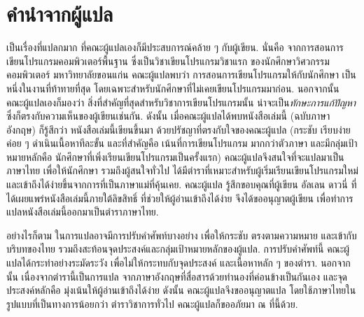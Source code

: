 \pagebreak

\section*{คำนำจากผู้แปล}

เป็นเรื่องที่แปลกมาก ที่คณะผู้แปลเองก็มีประสบการณ์คล้าย ๆ กับผู้เขียน.
นั่นคือ จากการสอนการเขียนโปรแกรมคอมพิวเตอร์พื้นฐาน ซึ่งเป็นวิชาเขียนโปรแกรมวิชาแรก
ของนักศึกษาวิศวกรรมคอมพิวเตอร์ มหาวิทยาลัยขอนแก่น
คณะผู้แปลพบว่า
การสอนการเขียนโปรแกรมให้กับนักศึกษา 
เป็นหนึ่งในงานที่ท้าทายที่สุด
โดยเฉพาะสำหรับนักศึกษาที่ไม่เคยเขียนโปรแกรมมาก่อน.
นอกจากนั้น คณะผู้แปลเองก็มองว่า สิ่งที่สำคัญที่สุดสำหรับวิชาการเขียนโปรแกรมนั้น
น่าจะเป็น\textit{ทักษะการแก้ปัญหา}
ซึ่งก็ตรงกับความเห็นของผู้เขียนเช่นกัน.
ดังนั้น เมื่อคณะผู้แปลได้พบหนังสือเล่มนี้ (ฉบับภาษาอังกฤษ) 
ก็รู้สึกว่า หนังสือเล่มนี้เขียนขึ้นมา ด้วยปรัชญาที่ตรงกับใจของคณะผู้แปล (กระชับ เรียบง่าย ค่อย ๆ ดำเนินเนื้อหาทีละขั้น และที่สำคัญคือ เน้นที่การเขียนโปรแกรม มากกว่าตัวภาษา 
และมีกลุ่มเป้าหมายหลักคือ นักศึกษาที่เพิ่งเรียนเขียนโปรแกรมเป็นครั้งแรก)
คณะผู้แปลจึงสนใจที่จะแปลมาเป็นภาษาไทย เพื่อให้นักศึกษา รวมถึงผู้สนใจทั่วไป ได้มีตำราที่เหมาะสำหรับผู้เริ่มเรียนเขียนโปรแกรมใหม่ และเข้าถึงได้ง่ายขึ้นจากการที่เป็นภาษาแม่ที่คุ้นเคย. 
คณะผู้แปล 
รู้สึกขอบคุณที่ผู้เขียน อัลเลน ดาวนี่ ที่ได้เผยแพร่หนังสือเล่มนี้ภายใต้ลิขสิทธิ์ ที่ช่วยให้ผู้อ่านเข้าถึงได้ง่าย จึงได้ขออนุญาตผู้เขียน เพื่อทำการแปลหนังสือเล่มนี้ออกมาเป็นตำราภาษาไทย.

อย่างไรก็ตาม ในการแปลอาจมีการปรับคำศัพท์บางอย่าง เพื่อให้กระชับ ตรงตามความหมาย และเข้ากับบริบทของไทย รวมถึงสะท้อนจุดประสงค์และกลุ่มเป้าหมายหลักของผู้แปล. การปรับคำศัพท์นี้ คณะผู้แปลได้กระทำอย่างระมัดระวัง เพื่อไม่ให้กระทบกับจุดประสงค์ และเนื้อหาหลัก ๆ ของตำรา.
นอกจากนั้น เนื่องจากตำรานี้เป็นการแปล
จากภาษาอังกฤษที่สื่อสารด้วยทำนองที่ค่อนข้างเป็นกันเอง
และจุดประสงค์หลักคือ มุ่งเน้นให้ผู้อ่านเข้าถึงได้ง่าย
ดังนั้น
คณะผู้แปลจึงขออนุญาตแปล โดยใช้ภาษาไทยในรูปแบบที่เป็นทางการน้อยกว่า ตำราวิชาการทั่วไป 
คณะผู้แปลก็ขออภัยมา ณ ที่นี้ด้วย. 

